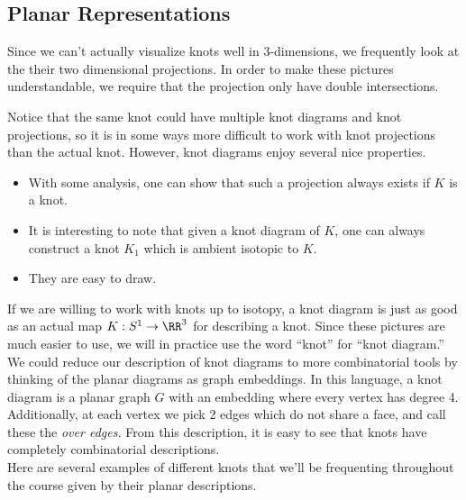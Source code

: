 \subsection{Planar Representations}

Since we can't actually visualize knots well in 3-dimensions, we frequently look at the their two dimensional projections. In order to make these pictures understandable, we require that the projection only have double intersections.\\

Notice that the same knot could have multiple knot diagrams and knot projections, so it is in some ways more difficult to work with knot projections than the actual knot. However, knot diagrams enjoy several nice properties.
\begin{itemize}
\item With some analysis, one can show that such a projection always exists if $K$ is a knot. 
\item It is interesting to note that given a knot diagram of $K$, one can always construct a knot $K_1$ which is ambient isotopic to $K$. 
\item They are easy to draw.
\end{itemize}
If we are willing to work with knots up to isotopy, a knot diagram is just as good as an actual map $K: S^1\to \RR^3$ for describing a knot. Since these pictures are much easier to use, we will in practice use the word ``knot'' for ``knot diagram.'' 
We could reduce our description of knot diagrams to more combinatorial tools by thinking of the planar diagrams as graph embeddings. In this language, a knot diagram is a planar graph $G$ with an embedding where every vertex has degree 4. Additionally, at each vertex we pick 2 edges which do not share a face, and call these the \emph{over edges.} From this description, it is easy to see that knots have completely combinatorial descriptions. \\
Here are several examples of different knots that we'll be frequenting throughout the course given by their planar descriptions.\\ 

